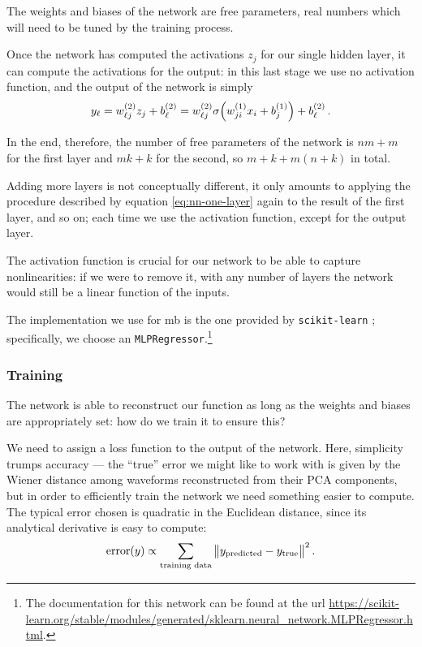 \documentclass[main.tex]{subfiles}
\begin{document}
The weights and biases of the network are free parameters, real numbers which will need to be tuned by the training process. 

Once the network has computed the activations \(z_j\) for our single hidden layer, it can compute the activations for the output: in this last stage we use no activation function, and the output of the network is simply 
%
\begin{align}
y_\ell = w^{(2)}_{\ell j} z_j + b^{(2)}_{\ell} 
= w^{(2)}_{\ell j} \sigma \qty( w^{(1)}_{ji} x_i + b^{(1)}_j ) + b^{(2)}_{\ell}
\,.
\end{align}

In the end, therefore, the number of free parameters of the network is \(nm + m\) for the first layer and \(mk + k\) for the second, so \(m + k + m (n+k)\) in total.

Adding more layers is not conceptually different, it only amounts to applying the procedure described by equation \ref{eq:nn-one-layer} again to the result of the first layer, and so on; each time we use the activation function, except for the output layer.

The activation function is crucial for our network to be able to capture nonlinearities: if we were to remove it, with any number of layers the network would still be a linear function of the inputs. 

The implementation we use for \acs{mb} is the one provided by \texttt{scikit-learn} \cite[]{pedregosaScikitlearnMachineLearning2011}; specifically, we choose an \texttt{MLPRegressor}.\footnote{The documentation for this network can be found at the url \url{https://scikit-learn.org/stable/modules/generated/sklearn.neural_network.MLPRegressor.html}.} 



\subsubsection{Training}

The network is able to reconstruct our function as long as the weights and biases are appropriately set: how do we train it to ensure this? 

We need to assign a loss function to the output of the network.
Here, simplicity trumps accuracy --- the ``true'' error we might like to work with is given by the Wiener distance among waveforms reconstructed from their PCA components, but in order to efficiently train the network we need something easier to compute.
The typical error chosen is quadratic in the Euclidean distance, since its analytical derivative is easy to compute: 
%
\begin{align} \label{eq:quadratic-loss}
\text{error}(y) \propto \sum _{\text{training data}} 
\norm{y _{\text{predicted}} - y _{\text{true}}}^2
\,.
\end{align}
\end{document}
